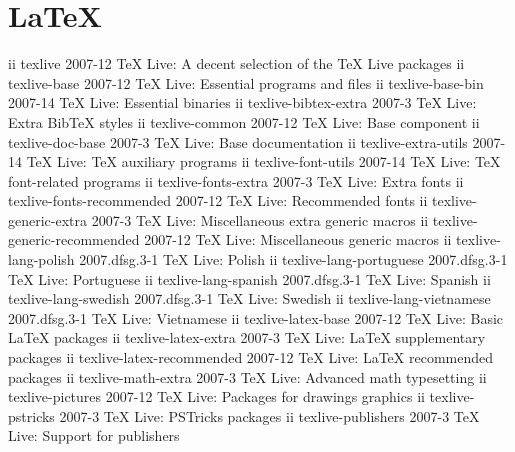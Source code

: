 \documentclass[12pt,brazil]{book}
\begin{document}
\chapter{LaTeX}
\label{cha:latex}

ii  texlive                              2007-12                     TeX Live: A decent selection of the TeX Live packages
ii  texlive-base                         2007-12                     TeX Live: Essential programs and files
ii  texlive-base-bin                     2007-14                     TeX Live: Essential binaries
ii  texlive-bibtex-extra                 2007-3                      TeX Live: Extra BibTeX styles
ii  texlive-common                       2007-12                     TeX Live: Base component
ii  texlive-doc-base                     2007-3                      TeX Live: Base documentation
ii  texlive-extra-utils                  2007-14                     TeX Live: TeX auxiliary programs
ii  texlive-font-utils                   2007-14                     TeX Live: TeX font-related programs
ii  texlive-fonts-extra                  2007-3                      TeX Live: Extra fonts
ii  texlive-fonts-recommended            2007-12                     TeX Live: Recommended fonts
ii  texlive-generic-extra                2007-3                      TeX Live: Miscellaneous extra generic macros
ii  texlive-generic-recommended          2007-12                     TeX Live: Miscellaneous generic macros
ii  texlive-lang-polish                  2007.dfsg.3-1               TeX Live: Polish
ii  texlive-lang-portuguese              2007.dfsg.3-1               TeX Live: Portuguese
ii  texlive-lang-spanish                 2007.dfsg.3-1               TeX Live: Spanish
ii  texlive-lang-swedish                 2007.dfsg.3-1               TeX Live: Swedish
ii  texlive-lang-vietnamese              2007.dfsg.3-1               TeX Live: Vietnamese
ii  texlive-latex-base                   2007-12                     TeX Live: Basic LaTeX packages
ii  texlive-latex-extra                  2007-3                      TeX Live: LaTeX supplementary packages
ii  texlive-latex-recommended            2007-12                     TeX Live: LaTeX recommended packages
ii  texlive-math-extra                   2007-3                      TeX Live: Advanced math typesetting
ii  texlive-pictures                     2007-12                     TeX Live: Packages for drawings graphics
ii  texlive-pstricks                     2007-3                      TeX Live: PSTricks packages
ii  texlive-publishers                   2007-3                      TeX Live: Support for publishers
\end{document}
